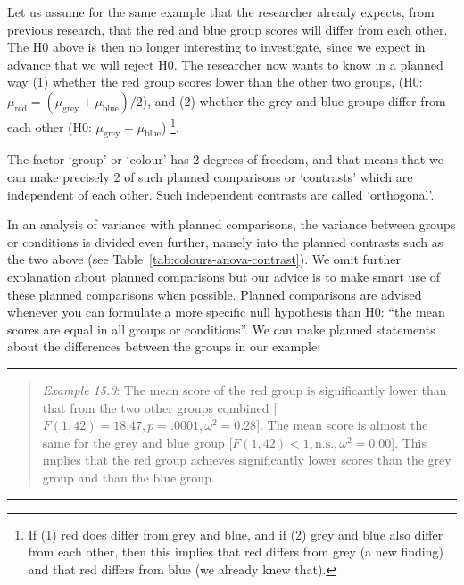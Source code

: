\documentclass[
]{book}
\begin{document}
Let us assume for the same example that the researcher already expects,
from previous research, that the red and blue group scores will differ from
each other. The H0 above is then no longer interesting to investigate, since
we expect in advance that we will reject H0. The researcher now wants to know
in a planned way (1) whether the red group scores lower than the other two groups,
(H0: \(\mu_\textrm{red} = (\mu_\textrm{grey}+\mu_\textrm{blue})/2\)),
and (2)
whether the grey and blue groups differ from each other (H0:
\(\mu_\textrm{grey} = \mu_\textrm{blue}\))
\footnote{If (1) red does differ from grey and blue, and if (2) grey and blue
  also differ from each other, then this implies that red differs from grey (a new
  finding) and that red differs from blue (we already knew that).}.

The factor `group' or `colour' has 2 degrees of freedom, and that means that we
can make precisely 2 of such planned comparisons or `contrasts' which are
independent of each other. Such independent contrasts
are called `orthogonal'.

In an analysis of variance with planned comparisons, the variance between
groups or conditions is divided even further, namely into the planned
contrasts such as the two above (see
Table~\ref{tab:colours-anova-contrast}). We omit further explanation
about planned comparisons but our advice is to make
smart use of these planned comparisons when possible. Planned comparisons are advised whenever
you can formulate a more
specific null hypothesis than H0: ``the mean scores are equal
in all groups or conditions''. We can make planned statements
about the differences between the groups in our example:

\begin{center}\rule{0.5\linewidth}{0.5pt}\end{center}

\begin{quote}
\emph{Example 15.3}:
The mean score of the red
group is significantly lower than that from the two other groups combined
{[}\(F(1,42)=18.47, p=.0001, \omega^2=0.28\){]}. The mean score is
almost the same for the grey and blue group
{[}\(F(1,42)<1, \textrm{n.s.}, \omega^2=0.00\){]}.
This implies that the red group achieves significantly lower scores than the
grey group and than the blue group.
\end{quote}

\begin{center}\rule{0.5\linewidth}{0.5pt}\end{center}
\end{document}
